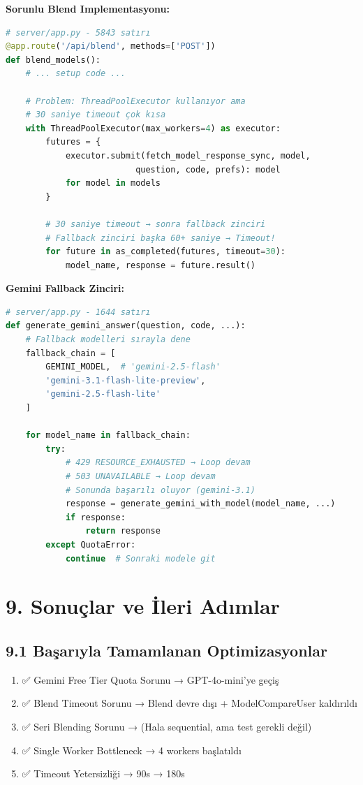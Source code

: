 \documentclass[12pt,a4paper]{report}
\begin{document}
\textbf{Sorunlu Blend Implementasyonu:}
\begin{lstlisting}[language=Python]
# server/app.py - 5843 satırı
@app.route('/api/blend', methods=['POST'])
def blend_models():
    # ... setup code ...
    
    # Problem: ThreadPoolExecutor kullanıyor ama
    # 30 saniye timeout çok kısa
    with ThreadPoolExecutor(max_workers=4) as executor:
        futures = {
            executor.submit(fetch_model_response_sync, model, 
                          question, code, prefs): model 
            for model in models
        }
        
        # 30 saniye timeout → sonra fallback zinciri
        # Fallback zinciri başka 60+ saniye → Timeout!
        for future in as_completed(futures, timeout=30):
            model_name, response = future.result()
\end{lstlisting}

\textbf{Gemini Fallback Zinciri:}
\begin{lstlisting}[language=Python]
# server/app.py - 1644 satırı
def generate_gemini_answer(question, code, ...):
    # Fallback modelleri sırayla dene
    fallback_chain = [
        GEMINI_MODEL,  # 'gemini-2.5-flash'
        'gemini-3.1-flash-lite-preview',
        'gemini-2.5-flash-lite'
    ]
    
    for model_name in fallback_chain:
        try:
            # 429 RESOURCE_EXHAUSTED → Loop devam
            # 503 UNAVAILABLE → Loop devam
            # Sonunda başarılı oluyor (gemini-3.1)
            response = generate_gemini_with_model(model_name, ...)
            if response:
                return response
        except QuotaError:
            continue  # Sonraki modele git
\end{lstlisting}

\newpage

\section{9. Sonuçlar ve İleri Adımlar}

\subsection{9.1 Başarıyla Tamamlanan Optimizasyonlar}

\begin{enumerate}
    \item ✅ Gemini Free Tier Quota Sorunu → GPT-4o-mini'ye geçiş
    \item ✅ Blend Timeout Sorunu → Blend devre dışı + ModelCompareUser kaldırıldı
    \item ✅ Seri Blending Sorunu → (Hala sequential, ama test gerekli değil)
    \item ✅ Single Worker Bottleneck → 4 workers başlatıldı
    \item ✅ Timeout Yetersizliği → 90s → 180s
\end{enumerate}
\end{document}
